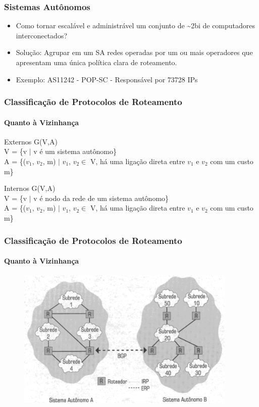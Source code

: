 \documentclass{beamer}
\begin{document}
\begin{frame}
\frametitle{Sistemas Autônomos}
\begin{itemize}
  \setlength{\itemsep}{0.7cm}%
  \item Como tornar escalável e administrável um conjunto de \textasciitilde2bi de
  computadores interconectados?
  \item Solução: Agrupar em um SA redes operadas por um ou mais operadores que apresentam uma única política clara de roteamento.
  \item Exemplo: AS11242 - POP-SC - Responsável por 73728 IPs 
\end{itemize}
\end{frame}

\begin{frame}
\frametitle{Classificação de Protocolos de Roteamento}
\framesubtitle{Quanto à Vizinhança}
\begin{block}{Externos}
G(V,A)\\
V = \{v $\mid$ v  é um sistema autônomo\}\\
A = \{($v_1$, $v_2$, m) $\mid$ $v_1$, $v_2 \in$ V, há uma ligação direta
entre $v_1$ e $v_2$  com um custo m\}
\end{block}

\begin{block}{Internos}
G(V,A)\\
V = \{v $\mid$ v é nodo da rede de um sistema autônomo\}\\
A = \{($v_1$, $v_2$, m) $\mid$ $v_1$, $v_2 \in$ V, há uma ligação direta
entre $v_1$ e $v_2$  com um custo m\}
\end{block}
\end{frame}

\begin{frame}
\frametitle{Classificação de Protocolos de Roteamento}
\framesubtitle{Quanto à Vizinhança}
\begin{figure}[htp]
\begin{center}
  \includegraphics[width=105mm]{Imagens/SistemaAutonomo.png}
  \label{sistema_autonomo}
\end{center}
\end{figure}
\end{frame}
\end{document}
